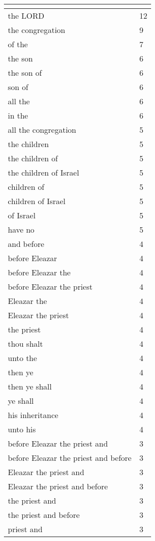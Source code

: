 \begin{center}
\begin{longtable}{|p{3.0in}|p{0.5in}|}
\hline \multicolumn{2}{c}{{ }} \\ \hline
\endfoot 
the LORD & 12\\ \hline 
the congregation & 9\\ \hline 
of the & 7\\ \hline 
the son & 6\\ \hline 
the son of & 6\\ \hline 
son of & 6\\ \hline 
all the & 6\\ \hline 
in the & 6\\ \hline 
all the congregation & 5\\ \hline 
the children & 5\\ \hline 
the children of & 5\\ \hline 
the children of Israel & 5\\ \hline 
children of & 5\\ \hline 
children of Israel & 5\\ \hline 
of Israel & 5\\ \hline 
have no & 5\\ \hline 
and before & 4\\ \hline 
before Eleazar & 4\\ \hline 
before Eleazar the & 4\\ \hline 
before Eleazar the priest & 4\\ \hline 
Eleazar the & 4\\ \hline 
Eleazar the priest & 4\\ \hline 
the priest & 4\\ \hline 
thou shalt & 4\\ \hline 
unto the & 4\\ \hline 
then ye & 4\\ \hline 
then ye shall & 4\\ \hline 
ye shall & 4\\ \hline 
his inheritance & 4\\ \hline 
unto his & 4\\ \hline 
before Eleazar the priest and & 3\\ \hline 
before Eleazar the priest and before & 3\\ \hline 
Eleazar the priest and & 3\\ \hline 
Eleazar the priest and before & 3\\ \hline 
the priest and & 3\\ \hline 
the priest and before & 3\\ \hline 
priest and & 3\\ \hline 

\end{longtable}
\end{center}
